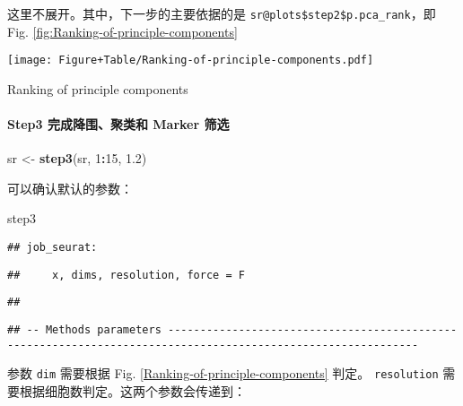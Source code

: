 \documentclass[
]{article}
\newenvironment{Shaded}{\begin{snugshade}}{\end{snugshade}}
\newcommand{\DecValTok}[1]{\textcolor[rgb]{0.00,0.00,0.81}{#1}}
\newcommand{\FloatTok}[1]{\textcolor[rgb]{0.00,0.00,0.81}{#1}}
\newcommand{\KeywordTok}[1]{\textcolor[rgb]{0.13,0.29,0.53}{\textbf{#1}}}
\newcommand{\NormalTok}[1]{#1}
\newcommand{\OperatorTok}[1]{\textcolor[rgb]{0.81,0.36,0.00}{\textbf{#1}}}
\newcommand{\StringTok}[1]{\textcolor[rgb]{0.31,0.60,0.02}{#1}}
\begin{document}
这里不展开。其中，下一步的主要依据的是 \texttt{sr@plots\$step2\$p.pca\_rank}，即 Fig. \ref{fig:Ranking-of-principle-components}

\def\@captype{figure}
\begin{center}
\texttt{[image: Figure+Table/Ranking-of-principle-components.pdf]}
\caption{Ranking of principle components}\label{fig:Ranking-of-principle-components}
\end{center}

\hypertarget{step3-ux5b8cux6210ux964dux56f4ux805aux7c7bux548c-marker-ux7b5bux9009}{%
\paragraph{Step3 完成降围、聚类和 Marker 筛选}\label{step3-ux5b8cux6210ux964dux56f4ux805aux7c7bux548c-marker-ux7b5bux9009}}

\begin{Shaded}
\begin{Highlighting}[]
\NormalTok{sr \textless{}{-}}\StringTok{ }\KeywordTok{step3}\NormalTok{(sr, }\DecValTok{1}\OperatorTok{:}\DecValTok{15}\NormalTok{, }\FloatTok{1.2}\NormalTok{)}
\end{Highlighting}
\end{Shaded}

可以确认默认的参数：

\begin{Shaded}
\begin{Highlighting}[]
\NormalTok{step3}
\end{Highlighting}
\end{Shaded}

\begin{verbatim}
## job_seurat:
\end{verbatim}

\begin{verbatim}
##     x, dims, resolution, force = F
\end{verbatim}

\begin{verbatim}
## 
\end{verbatim}

\begin{verbatim}
## -- Methods parameters -------------------------------------------------------------------------------------------------------------
\end{verbatim}

参数 \texttt{dim} 需要根据 Fig. \ref{Ranking-of-principle-components} 判定。
\texttt{resolution} 需要根据细胞数判定。这两个参数会传递到：
\end{document}
